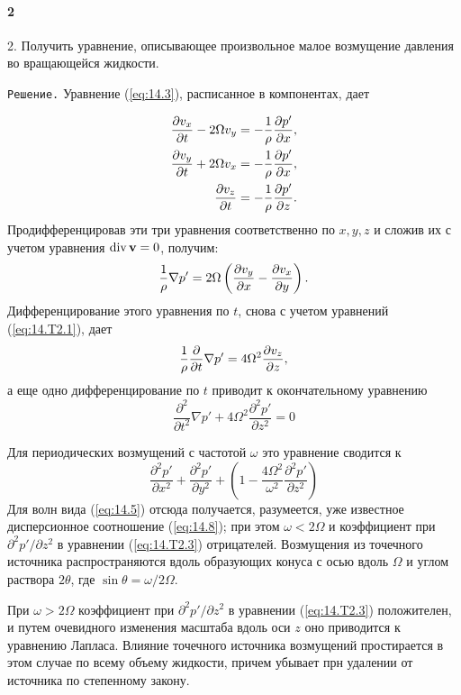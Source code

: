 \paragraph*{2}
2. Получить уравнение, описывающее произвольное малое возмущение давления во
вращающейся жидкости.

\texttt{Решение.} Уравнение (\ref{eq:14.3}), расписанное в компонентах, дает

\begin{eqnarray}
   \label{eq:14.T2.1}
   \frac{\partial{v_x}}{\partial{t}} - 2\Omega v_y = - \frac1{\rho} \frac{\partial{p'}}{\partial{x}}, \nonumber \\
   \frac{\partial{v_y}}{\partial{t}} + 2\Omega v_x = - \frac1{\rho} \frac{\partial{p'}}{\partial{x}},  \\
   \frac{\partial{v_z}}{\partial{t}}               = - \frac1{\rho} \frac{\partial{p'}}{\partial{z}}. \nonumber
\end{eqnarray}
Продифференцировав эти три уравнения соответственно по $x,y,z$ и сложив их с
учетом уравнения $\mathop{\mathrm{div}}\nolimits{ \mathbf{v} } = 0$, получим:
\[
   \frac1{\rho}\nabla p' = 2\Omega \left( \frac{\partial{v_y}}{\partial{x}} - \frac{\partial{v_x}}{\partial{y}} \right).
\]
Дифференцирование этого уравнения по $t$, снова с учетом уравнений (\ref{eq:14.T2.1}), дает
\[
   \frac1{\rho}\frac{\partial}{\partial t} \nabla p' = 4 \Omega^2 \frac{\partial{v_z}}{\partial{z}},
\]
а еще одно дифференцирование по $t$ приводит к окончательному уравнению
\begin{equation}
   \label{eq:14.T2.2}
   \frac{\partial^2}{\partial t^2} \nabla p'
   + 4 \Omega^2 \frac{\partial^2 p'}{\partial z^2} = 0
\end{equation}

Для периодических возмущений с частотой $\omega$ это уравнение сводится к
\begin{equation}
   \label{eq:14.T2.3}
   \frac{\partial^2p'}{\partial x^2} +
   \frac{\partial^2p'}{\partial y^2} +
   \left( 1-\frac{4 \Omega^2}{\omega^2} \frac{\partial^2 p'}{\partial z^2} \right)
\end{equation}
Для волн вида (\ref{eq:14.5}) отсюда получается, разумеется, уже известное дисперсионное
соотношение (\ref{eq:14.8}); при этом $\omega < 2 \Omega$ и коэффициент при $\partial
^2p'/\partial z^2$ в уравнении (\ref{eq:14.T2.3}) отрицателей. Возмущения из точечного
источника распространяются вдоль образующих конуса с осью вдоль $\Omega$ и углом
раствора $2\theta$, где $\sin\theta = \omega/2 \Omega$.

При $\omega > 2 \Omega$ коэффициент при $\partial ^2p'/\partial z^2$ в уравнении
(\ref{eq:14.T2.3}) положителен, и путем очевидного изменения масштаба вдоль оси $z$ оно
приводится к уравнению Лапласа. Влияние точечного источника возмущений
простирается в этом случае по всему объему жидкости, причем убывает прн удалении
от источника по степенному закону.
